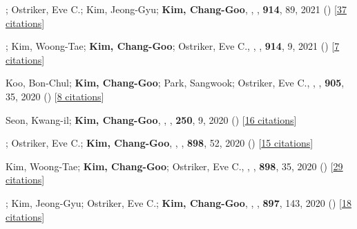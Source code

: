 \item[{23.}]; Ostriker, Eve C.; Kim, Jeong-Gyu; \textbf{Kim, Chang-Goo}, , \apj, \textbf{914}, 89, 2021 () [\href{http://adsabs.harvard.edu/abs/2021ApJ...914...89L}{37 citations}]

\item[{24.}]; Kim, Woong-Tae; \textbf{Kim, Chang-Goo}; Ostriker, Eve C., , \apj, \textbf{914}, 9, 2021 () [\href{http://adsabs.harvard.edu/abs/2021ApJ...914....9M}{7 citations}]

\item[{25.}]Koo, Bon-Chul; \textbf{Kim, Chang-Goo}; Park, Sangwook; Ostriker, Eve C., , \apj, \textbf{905}, 35, 2020 () [\href{http://adsabs.harvard.edu/abs/2020ApJ...905...35K}{8 citations}]

\item[{26.}]Seon, Kwang-il; \textbf{Kim, Chang-Goo}, , \apjs, \textbf{250}, 9, 2020 () [\href{http://adsabs.harvard.edu/abs/2020ApJS..250....9S}{16 citations}]

\item[{27.}]; Ostriker, Eve C.; \textbf{Kim, Chang-Goo}, , \apj, \textbf{898}, 52, 2020 () [\href{http://adsabs.harvard.edu/abs/2020ApJ...898...52M}{15 citations}]

\item[{28.}]Kim, Woong-Tae; \textbf{Kim, Chang-Goo}; Ostriker, Eve C., , \apj, \textbf{898}, 35, 2020 () [\href{http://adsabs.harvard.edu/abs/2020ApJ...898...35K}{29 citations}]

\item[{29.}]; Kim, Jeong-Gyu; Ostriker, Eve C.; \textbf{Kim, Chang-Goo}, , \apj, \textbf{897}, 143, 2020 () [\href{http://adsabs.harvard.edu/abs/2020ApJ...897..143K}{18 citations}]

